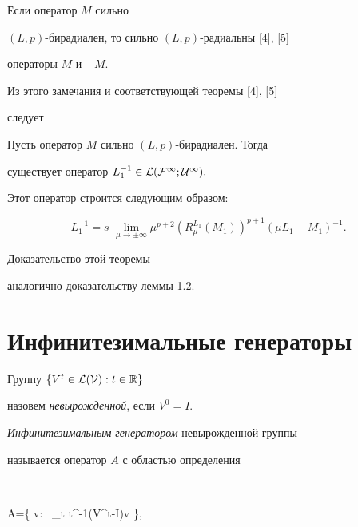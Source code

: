 \begin{notes}


Если оператор $M$ сильно


$(L,p)$-бирадиален, то сильно $(L,p)$-радиальны [4], [5]


операторы $M$ и $-M$.


\end{notes}





Из этого замечания и соответствующей теоремы [4], [5]


следует





\begin{thms}


Пусть оператор $M$ сильно $(L,p)$-бирадиален. Тогда


существует оператор $L^{-1}_1\in \cal L(\cal F^1;\cal U^1).$


\end{thms}





Этот оператор строится следующим образом:


$$


L_1^{-1}=s\text{-}\lim\limits_{\mu\to\pm\infty}


\mu^{p+2}(R_{\mu}^{L_1}(M_1))^{p+1}(\mu L_1-M_1)^{-1}.


$$


Доказательство этой теоремы


аналогично доказательству леммы 1.2.





\section{Инфинитезимальные генераторы}





Группу $\{ V^t\in {\cal L(\cal V)}:t\in {\Bbb R}\}$


назовем {\it невырожденной}, если $V^0=I$.


{\it Инфинитезимальным генератором}  невырожденной группы


называется оператор $A$ с областью определения


$$


\dom A=\{ v: \exists\, \lim_{t} t^{-1}(V^t-I)v \},


